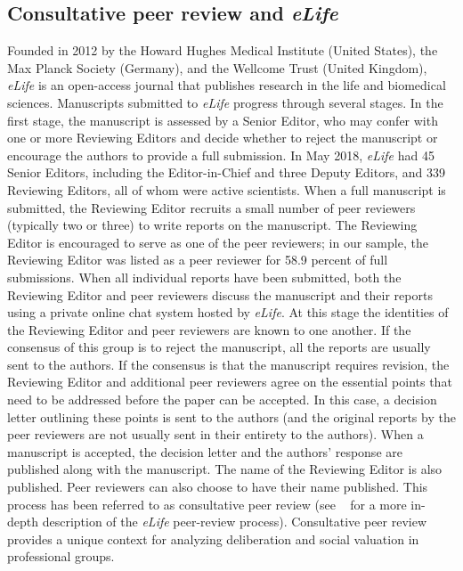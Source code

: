 \documentclass[10pt,letterpaper]{article}
\begin{document}
\subsection*{Consultative peer review and \textit{eLife}}
Founded in 2012 by the Howard Hughes Medical Institute (United States), the Max Planck Society (Germany), and the Wellcome Trust (United Kingdom), \textit{eLife} is an open-access journal that publishes research in the life and biomedical sciences. Manuscripts submitted to \textit{eLife} progress through several stages. In the first stage, the manuscript is assessed by a Senior Editor, who may confer with one or more Reviewing Editors and decide whether to reject the manuscript or encourage the authors to provide a full submission. In May 2018, \textit{eLife} had 45 Senior Editors, including the Editor-in-Chief and three Deputy Editors, and 339 Reviewing Editors, all of whom were active scientists. When a full manuscript is submitted, the Reviewing Editor recruits a small number of peer reviewers (typically two or three) to write reports on the manuscript. The Reviewing Editor is encouraged to serve as one of the peer reviewers; in our sample, the Reviewing Editor was listed as a peer reviewer for 58.9 percent of full submissions. When all individual reports have been submitted, both the Reviewing Editor and peer reviewers discuss the manuscript and their reports using a private online chat system hosted by \textit{eLife}. At this stage the identities of the Reviewing Editor and peer reviewers are known to one another. If the consensus of this group is to reject the manuscript, all the reports are usually sent to the authors. If the consensus is that the manuscript requires revision, the Reviewing Editor and additional peer reviewers agree on the essential points that need to be addressed before the paper can be accepted. In this case, a decision letter outlining these points is sent to the authors (and the original reports by the peer reviewers are not usually sent in their entirety to the authors). When a manuscript is accepted, the decision letter and the authors' response are published along with the manuscript. The name of the Reviewing Editor is also published. Peer reviewers can also choose to have their name published. This process has been referred to as consultative peer review (see ~\cite{schekman_scientific_2013,king_peer_2017} for a more in-depth description of the \textit{eLife} peer-review process). Consultative peer review provides a unique context for analyzing deliberation and social valuation in professional groups. 
\end{document}
